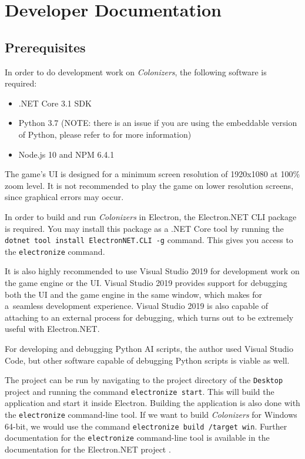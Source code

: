 \section{Developer Documentation}
\label{sec:devdocs} 

\subsection{Prerequisites}

In order to do development work on \emph{Colonizers}, the following software
is required:
\begin{itemize}
    \item .NET Core 3.1 SDK
    \item Python 3.7 (NOTE: there is an issue if you are using the embeddable
        version of Python, please refer to  for more information)
    \item Node.js 10 and NPM 6.4.1
\end{itemize}
The game's UI is designed for a minimum screen resolution of 1920x1080 at
100\% zoom level. It is not recommended to play the game on lower resolution
screens, since graphical errors may occur.

In order to build and run \emph{Colonizers} in Electron, the Electron.NET CLI
package is required. You may install this package as a .NET Core tool by running
the \texttt{dotnet tool install ElectronNET.CLI -g} command. This gives you
access to the \texttt{electronize} command.

It is also highly recommended to use Visual Studio 2019 for development work
on the game engine or the UI. Visual Studio 2019 provides support for debugging
both the UI and the game engine in the same window, which makes for a~seamless
development experience. Visual Studio 2019 is also capable of attaching
to an external process for debugging, which turns out to be
extremely useful with Electron.NET.

For developing and debugging Python AI scripts, the author used Visual Studio Code,
but other software capable of debugging Python scripts is viable as well.

The project can be run by navigating to the project directory of the \texttt{Desktop} project
and running the command \texttt{electronize start}. This will build the application
and start it inside Electron. Building the application is also done with the
\texttt{electronize} command-line tool. If we want to build \emph{Colonizers}
for Windows 64-bit, we would use the command \texttt{electronize build /target win}.
Further documentation for the \texttt{electronize} command-line tool
is available in the documentation for the Electron.NET project \cite{Electronnet}.

